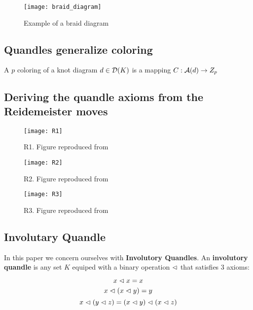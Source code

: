 \documentclass[paper.tex]{subfiles}
\begin{document}
\begin{figure}[h]
  \centering
  \texttt{[image: braid\_diagram]}
  \caption{Example of a braid diagram}\label{fig:braid_diagram}
\end{figure}



\subsection{Quandles generalize coloring}

A $p$ coloring of a knot diagram $d \in \operatorname{\mathcal{D}}(K)$ is a mapping $C: \mathcal{A}(d) \to Z_p$

\subsection{Deriving the quandle axioms from the Reidemeister moves}
\label{sec:quandle_axioms}


\begin{figure}[h]
  \centering
  \texttt{[image: R1]}
  \caption{R1. Figure reproduced from~\cite{Cusick}}\label{fig:r1}
\end{figure}

\begin{figure}[h]
  \centering
  \texttt{[image: R2]}
  \caption{R2. Figure reproduced from~\cite{Cusick}}\label{fig:r2}
\end{figure}

\begin{figure}[h]
  \centering
  \texttt{[image: R3]}
  \caption{R3. Figure reproduced from~\cite{Cusick}}\label{fig:r3}
\end{figure}



\subsection{Involutary Quandle}
In this paper we concern ourselves with \textbf{Involutory Quandles}. An \textbf{involutory quandle} is any set $K$ equiped with a binary operation $\vartriangleleft$ that satisfies $3$ axioms:

\begin{equation}
	x \vartriangleleft x = x
\end{equation}
\begin{equation}
	x \vartriangleleft (x \vartriangleleft y) = y \\
\end{equation}
\begin{equation}
	x \vartriangleleft (y \vartriangleleft z) = (x \vartriangleleft y) \vartriangleleft (x \vartriangleleft z) \\
\end{equation}
\end{document}
